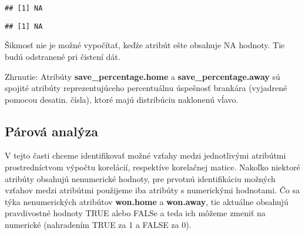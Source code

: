 \documentclass[
]{article}
\newenvironment{Shaded}{\begin{snugshade}}{\end{snugshade}}
\newcommand{\FunctionTok}[1]{\textcolor[rgb]{0.00,0.00,0.00}{#1}}
\newcommand{\NormalTok}[1]{#1}
\newcommand{\OtherTok}[1]{\textcolor[rgb]{0.56,0.35,0.01}{#1}}
\newcommand{\SpecialCharTok}[1]{\textcolor[rgb]{0.00,0.00,0.00}{#1}}
\newcommand{\StringTok}[1]{\textcolor[rgb]{0.31,0.60,0.02}{#1}}
\begin{document}
\begin{verbatim}
## [1] NA
\end{verbatim}

\begin{Shaded}
\end{Shaded}

\begin{verbatim}
## [1] NA
\end{verbatim}

Šikmosť nie je možné vypočítať, keďźe atribút ešte obsahuje NA hodnoty.
Tie budú odstranené pri čistení dát.

Zhrnutie: Atribúty \textbf{save\_percentage.home} a
\textbf{save\_percentage.away} sú spojité atribúty reprezentujúceho
percentuálnu úspešnosť brankára (vyjadrené pomocou desatin. čísla),
ktoré majú distribúciu naklonenú vĺavo.

\hypertarget{puxe1rovuxe1-analuxfdza}{%
\subsection{Párová analýza}\label{puxe1rovuxe1-analuxfdza}}

V tejto časti chceme identifikovať možné vzťahy medzi jednotlivými
atribútmi prostredníctvom výpočtu korelácií, respektíve korelačnej
matice. Nakoľko niektoré atribúty obsahujú nenumerické hodnoty, pre
prvotnú identifikáciu možných vzťahov medzi atribútmi použijeme iba
atribúty s numerickými hodnotami. Čo sa týka nenumerických atribútov
\textbf{won.home} a \textbf{won.away}, tie aktuálne obsahujú
pravdivostné hodnoty TRUE alebo FALSe a teda ich môžeme zmeniť na
numerické (nahradením TRUE za 1 a FALSE za 0).

\begin{Shaded}
\end{Shaded}
\end{document}
